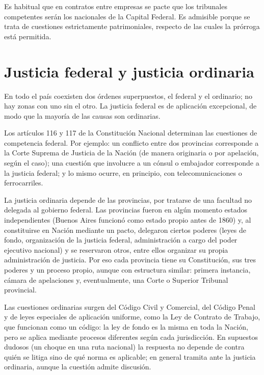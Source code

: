 \documentclass[12pt,oneside]{book}
\begin{document}
\begin{nota}
Es habitual que en contratos entre empresas se pacte que los tribunales competentes serán los nacionales de la Capital Federal. Es admisible porque se trata de cuestiones estrictamente patrimoniales, respecto de las cuales la prórroga está permitida.
\end{nota}

\section{Justicia federal y justicia ordinaria}

En todo el país coexisten dos órdenes superpuestos, el federal y el ordinario; no hay zonas con uno sin el otro. La justicia federal es de aplicación excepcional, de modo que la mayoría de las causas son ordinarias.

\begin{importante}
Los artículos 116 y 117 de la Constitución Nacional determinan las cuestiones de competencia federal. Por ejemplo: un conflicto entre dos provincias corresponde a la Corte Suprema de Justicia de la Nación (de manera originaria o por apelación, según el caso); una cuestión que involucre a un cónsul o embajador corresponde a la justicia federal; y lo mismo ocurre, en principio, con telecomunicaciones o ferrocarriles.
\end{importante}

La justicia ordinaria depende de las provincias, por tratarse de una facultad no delegada al gobierno federal. Las provincias fueron en algún momento estados independientes (Buenos Aires funcionó como estado propio antes de 1860) y, al constituirse en Nación mediante un pacto, delegaron ciertos poderes (leyes de fondo, organización de la justicia federal, administración a cargo del poder ejecutivo nacional) y se reservaron otros, entre ellos organizar su propia administración de justicia. Por eso cada provincia tiene su Constitución, sus tres poderes y un proceso propio, aunque con estructura similar: primera instancia, cámara de apelaciones y, eventualmente, una Corte o Superior Tribunal provincial.

Las cuestiones ordinarias surgen del Código Civil y Comercial, del Código Penal y de leyes especiales de aplicación uniforme, como la Ley de Contrato de Trabajo, que funcionan como un código: la ley de fondo es la misma en toda la Nación, pero se aplica mediante procesos diferentes según cada jurisdicción. En supuestos dudosos (un choque en una ruta nacional) la respuesta no depende de contra quién se litiga sino de qué norma es aplicable; en general tramita ante la justicia ordinaria, aunque la cuestión admite discusión.
\end{document}

